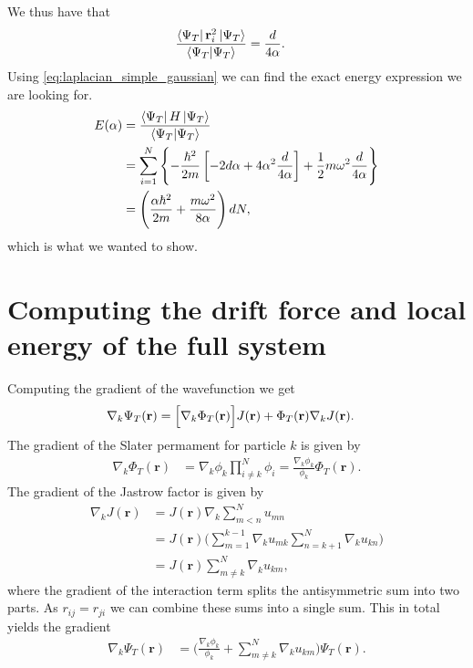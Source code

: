 \documentclass[
    a4paper, aps, twocolumn, floatfix, superscriptaddress,
    nofootinbib]{revtex4-1}
\newcommand{\vf}{\mathbf}
\newcommand{\1}{\mathds{1}}
\newcommand{\para}[1]{\left(#1\right)}
\newcommand{\brak}[1]{\left[#1\right]}
\newcommand{\brac}[1]{\left\{#1\right\}}
\begin{document}
    We thus have that
    \begin{align}
        \frac{\bra{\Psi_T}\vf{r}_i^2\ket{\Psi_T}}{\bra{\Psi_T}\ket{\Psi_T}}
        &=
        \frac{d}{4\alpha}.
    \end{align}
    Using \autoref{eq:laplacian_simple_gaussian} we can find the exact energy
    expression we are looking for.
    \begin{align}
        E(\alpha)
        &=
        \frac{\bra{\Psi_T}H\ket{\Psi_T}}{\bra{\Psi_T}\ket{\Psi_T}}
        \\
        &=
        \sum_{i = 1}^N
        \brac{
            -\frac{\hbar^2}{2m}
            \brak{
                -2d\alpha
                + 4\alpha^2\frac{d}{4\alpha}
            }
            + \frac{1}{2}m\omega^2\frac{d}{4\alpha}
        }
        \\
        &=
        \para{
            \frac{\alpha\hbar^2}{2m}
            + \frac{m\omega^2}{8\alpha}
        }dN,
    \end{align}
    which is what we wanted to show.


\section{Computing the drift force and local energy of the full system}
    Computing the gradient of the wavefunction we get
    \begin{align}
        \nabla_k\Psi_T(\vf{r})
        &=
        \Bigl[
            \nabla_k
            \Phi_T(\vf{r})
        \Bigr]
        J(\vf{r})
        + \Phi_T(\vf{r})
        \nabla_k J(\vf{r}).
    \end{align}
    The gradient of the Slater permament for particle $k$ is given by
    \begin{align}
        \nabla_k
        \Phi_T(\vf{r})
        &=
        \nabla_k\phi_k
        \prod_{i \neq k}^N\phi_i
        = \frac{\nabla_k\phi_k}{\phi_k}
        \Phi_T(\vf{r}).
    \end{align}
    The gradient of the Jastrow factor is given by
    \begin{align}
        \nabla_k J(\vf{r})
        &=
        J(\vf{r})
        \nabla_k\sum_{m < n}^N u_{mn} \\
        &= J(\vf{r})
        \Biggl(
            \sum_{m = 1}^{k - 1}\nabla_k u_{mk}
            \sum_{n = k + 1}^N\nabla_k u_{kn}
        \Biggr)
        \\
        &=
        J(\vf{r})
        \sum_{m \neq k}^N\nabla_k u_{km},
    \end{align}
    where the gradient of the interaction term splits the antisymmetric
    sum into two parts. As $r_{ij} = r_{ji}$ we can combine these sums
    into a single sum. This in total yields the gradient
    \begin{align}
        \nabla_k\Psi_T(\vf{r})
        &=
        \Biggl(
            \frac{\nabla_k\phi_k}{\phi_k}
            + \sum_{m \neq k}^N
            \nabla_k u_{km}
        \Biggr)
        \Psi_T(\vf{r}).
        \label{eq:gradient_full_wavefunction}
    \end{align}
\end{document}

